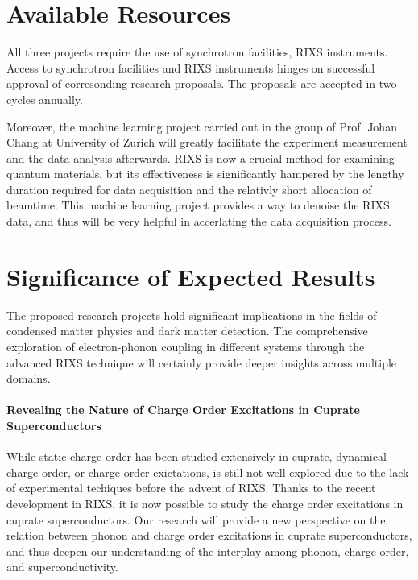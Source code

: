 \documentclass[11pt]{article}
\begin{document}
\section{Available Resources}
All three projects require the use of synchrotron facilities, RIXS instruments. Access to synchrotron facilities and RIXS instruments hinges on successful approval of corresonding research proposals. The proposals are accepted in two cycles annually. 


Moreover, the machine learning project carried out in the group of Prof. Johan Chang at University of Zurich will greatly facilitate the experiment measurement and the data analysis afterwards. RIXS is now a crucial method for examining quantum materials, but its effectiveness is significantly hampered by the lengthy duration required for data acquisition and the relativly short allocation of beamtime. This machine learning project provides a way to denoise the RIXS data, and thus will be very helpful in accerlating the data acquisition process.  


\section{Significance of Expected Results}

The proposed research projects hold significant implications in the fields of condensed matter physics and dark matter detection. The comprehensive exploration of electron-phonon coupling in different systems through the advanced RIXS technique will certainly provide deeper insights across multiple domains.

\paragraph{Revealing the Nature of Charge Order Excitations in Cuprate Superconductors} While static charge order has been studied extensively in cuprate, dynamical charge order, or charge order exictations, is still not well explored due to the lack of experimental techiques before the advent of RIXS\cite{li_multiorbital_2020}. Thanks to the recent development in RIXS, it is now possible to study the charge order excitations in cuprate superconductors. Our research will provide a new perspective on the relation between phonon and charge order excitations in cuprate superconductors, and thus deepen our understanding of the interplay among phonon, charge order, and superconductivity. 
\end{document}
